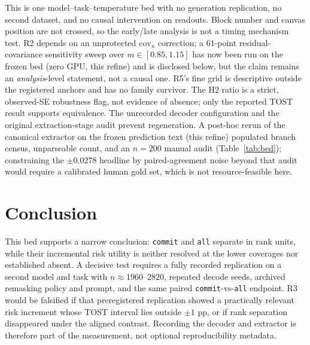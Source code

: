 \documentclass{article}
\begin{document}
This is one model--task--temperature bed with no generation replication, no second dataset, and
no causal intervention on readouts.  Block number and canvas position are not crossed, so the
early/late analysis is not a timing mechanism test.  R2 depends on an unprotected
$\mathrm{cov}_u$ correction; a $61$-point residual-covariance sensitivity sweep over
$m\in[0.85,1.15]$ has now been run on the frozen bed (zero GPU, this refine) and is disclosed
below, but the claim remains an \emph{analysis}-level statement, not a causal one.  R5's fine
grid is descriptive outside the registered anchors and has no family survivor.  The H2 ratio is a strict, observed-SE robustness flag, not evidence of absence;
only the reported TOST result supports equivalence.  The unrecorded decoder configuration and
the original extraction-stage audit prevent regeneration.  A post-hoc rerun of the canonical
extractor on the frozen prediction text (this refine) populated branch census, unparseable
count, and an $n=200$ manual audit (Table~\ref{tab:bed}); constraining the $\pm 0.0278$
headline by paired-agreement noise beyond that audit would require a calibrated human gold
set, which is not resource-feasible here.

\section{Conclusion}
\label{sec:conclusion}

This bed supports a narrow conclusion: \texttt{commit} and \texttt{all}
separate in rank units, while their incremental risk utility is neither
resolved at the lower coverages nor established absent.  A decisive test
requires a fully recorded replication on a second model and task with
$n\approx1960$--$2820$, repeated decode seeds, archived remasking policy and
prompt, and the same paired \texttt{commit}-vs-\texttt{all} endpoint.  R3 would
be falsified if that preregistered replication showed a practically relevant
risk increment whose TOST interval lies outside $\pm1$ pp, or if rank
separation disappeared under the aligned contrast.  Recording the decoder and
extractor is therefore part of the measurement, not optional reproducibility
metadata.
\end{document}
